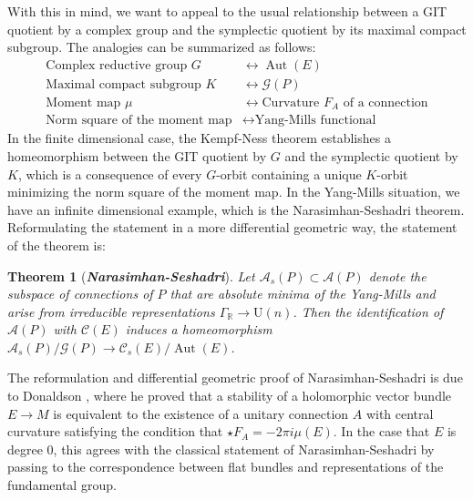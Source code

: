 \documentclass[psamsfonts, 12pt]{amsart}
\newtheorem{thm}{Theorem}[section]
\theoremstyle{definition}
\theoremstyle{remark}
\newcommand{\R}{\mathbb{R}}
\newcommand{\ib}[1]{\textbf{\textit{#1}}}
\DeclareMathOperator{\Aut}{Aut}
\begin{document}
With this in mind, we want to appeal to the usual relationship between a GIT
quotient by a complex group and the symplectic quotient by its maximal compact
subgroup. The analogies can be summarized as follows:
\begin{align*}
\text{Complex reductive group } G &\longleftrightarrow \Aut(E) \\
\text{Maximal compact subgroup } K &\longleftrightarrow \mathscr{G}(P) \\
\text{Moment map } \mu &\longleftrightarrow \text{Curvature }
F_A \text{ of a connection} \\
\text{Norm square of the moment map} &\longleftrightarrow \text{Yang-Mills functional}
\end{align*}
%
In the finite dimensional case, the Kempf-Ness theorem establishes a homeomorphism
between the GIT quotient by $G$ and the symplectic quotient by $K$, which is a
consequence of every $G$-orbit containing a unique $K$-orbit minimizing the norm square
of the moment map. In the Yang-Mills situation, we have an infinite dimensional
example, which is the Narasimhan-Seshadri theorem. Reformulating the statement in
a more differential geometric way, the statement of the theorem is:
%
\begin{thm}[\ib{Narasimhan-Seshadri}]
Let $\mathscr{A}_s(P) \subset \mathscr{A}(P)$ denote the subspace of connections of $P$
that are absolute minima of the Yang-Mills and arise from irreducible representations
$\Gamma_\R \to \mathrm{U}(n)$. Then the identification of $\mathscr{A}(P)$ with
$\mathscr{C}(E)$ induces a homeomorphism
$\mathscr{A}_s(P)/\mathscr{G}(P) \to \mathscr{C}_s(E)/\Aut(E)$.
\end{thm}
%
The reformulation and differential geometric proof of Narasimhan-Seshadri is due
to Donaldson \cite{donaldson1983}, where he proved that a stability of a holomorphic
vector bundle $E \to M$ is equivalent to the existence of a unitary connection $A$
with central curvature satisfying the condition that $\star F_A = -2\pi i \mu(E)$.
In the case that $E$ is degree $0$, this agrees with the classical statement of
Narasimhan-Seshadri by passing to the correspondence between flat bundles and
representations of the fundamental group. \\
\end{document}

